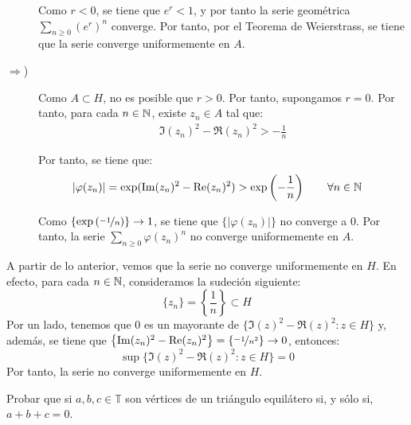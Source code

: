 \begin{ejercicio}
\begin{description}
        Como $r<0$, se tiene que $e^r<1$, y por tanto la serie geométrica $\sum\limits_{n\geq 0} \left(e^r\right)^n$ converge. Por tanto, por el Teorema de Weierstrass, se tiene que la serie converge uniformemente en $A$.

        \item[$\Longrightarrow$)] Como $A\subset H$, no es posible que $r>0$. Por tanto, supongamos $r=0$. Por tanto, para cada $n\in \bb{N}$, existe $z_n\in A$ tal que:
        \begin{align*}
            \Im(z_n)^2 - \Re(z_n)^2 > -\frac{1}{n}
        \end{align*}

        Por tanto, se tiene que:
        \begin{align*}
            |\varphi(z_n)| &= \exp(\Im(z_n)^2 - \Re(z_n)^2) > \exp\left(-\frac{1}{n}\right)\qquad \forall n\in \bb{N}
        \end{align*}

        Como $\left\{\exp\left(\nicefrac{-1}{n}\right)\right\}\to 1$, se tiene que $\{|\varphi(z_n)|\}$ no converge a $0$. Por tanto, la serie $\sum\limits_{n\geq 0} \varphi(z_n)^n$ no converge uniformemente en $A$.
    \end{description}

    A partir de lo anterior, vemos que la serie no converge uniformemente en $H$. En efecto, para cada $n\in \bb{N}$, consideramos la sudeción siguiente:
    \begin{equation*}
        \{z_n\} = \left\{\dfrac{1}{n}\right\} \subset H
    \end{equation*}
    Por un lado, tenemos que $0$ es un mayorante de $\{\Im(z)^2 - \Re(z)^2 : z\in H\}$ y, además, se tiene que  $\left\{\Im(z_n)^2 - \Re(z_n)^2\right\} = \left\{\nicefrac{-1}{n^2}\right\} \to 0$, entonces:
    \begin{equation*}
        \sup\{\Im(z)^2 - \Re(z)^2 : z\in H\} = 0
    \end{equation*}
    Por tanto, la serie no converge uniformemente en $H$.
\end{ejercicio}

\begin{ejercicio}
    Probar que si $a,b,c \in \mathbb{T}$ son vértices de un triángulo equilátero si, y sólo si, $a+b+c = 0$.
\end{ejercicio}

